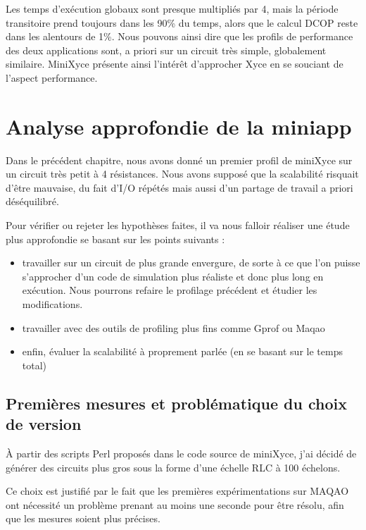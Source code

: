 \documentclass[11pt,a4paper,oneside]{memoir}
\theoremstyle{definition}
\theoremstyle{remark}
\theoremstyle{plain}
\begin{document}
Les temps d'exécution globaux sont presque multipliés par 4, mais la période transitoire prend toujours dans les 90\% du temps, alors que le calcul DCOP reste dans les alentours de 1\%. Nous pouvons ainsi dire que les profils de performance des deux applications sont, a priori sur un circuit très simple, globalement similaire. MiniXyce présente ainsi l'intérêt d'approcher Xyce en se souciant de l'aspect performance. 









\chapter{Analyse approfondie de la miniapp}

Dans le précédent chapitre, nous avons donné un premier profil de miniXyce sur un circuit très petit à 4 résistances. Nous avons supposé que la scalabilité risquait d'être mauvaise, du fait d'I/O répétés mais aussi d'un partage de travail a priori déséquilibré.

Pour vérifier ou rejeter les hypothèses faites, il va nous falloir réaliser une étude plus approfondie se basant sur les points suivants :
\begin{itemize}
\item travailler sur un circuit de plus grande envergure, de sorte à ce que l'on puisse s'approcher d'un code de simulation plus réaliste et donc plus long en exécution. Nous pourrons refaire le profilage précédent et étudier les modifications.
\item travailler avec des outils de profiling plus fins comme Gprof ou Maqao
\item enfin, évaluer la scalabilité à proprement parlée (en se basant sur le temps total)
\end{itemize}



\section{Premières mesures et problématique du choix de version}

\`A partir des scripts Perl proposés dans le code source de miniXyce, j'ai décidé de générer des circuits plus gros sous la forme d'une échelle RLC à 100 échelons.

Ce choix est justifié par le fait que les premières expérimentations sur MAQAO ont nécessité un problème prenant au moins une seconde pour être résolu, afin que les mesures soient plus précises.
\end{document}
